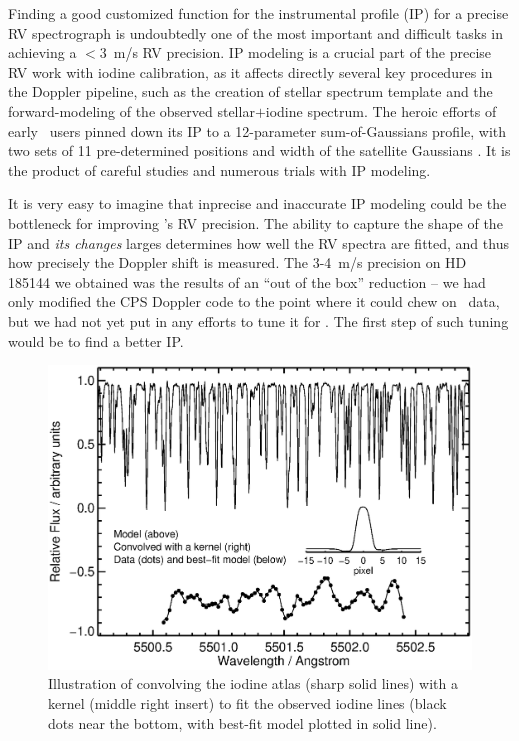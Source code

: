 
Finding a good customized function for the instrumental profile (IP)
for a precise RV spectrograph is undoubtedly one of the most important
and difficult tasks in achieving a $<3$~m/s RV precision. IP modeling
is a crucial part of the precise RV work with iodine calibration, as
it affects directly several key procedures in the Doppler pipeline,
such as the creation of stellar spectrum template and the
forward-modeling of the observed stellar$+$iodine spectrum. The heroic
efforts of early \keck\ users pinned down its IP to a 12-parameter
sum-of-Gaussians profile, with two sets of 11 pre-determined positions
and width of the satellite Gaussians \citep{1995PASP..107..966V}. It
is the product of careful studies and numerous trials with IP
modeling.

It is very easy to imagine that inprecise and inaccurate IP modeling
could be the bottleneck for improving \het's RV precision. The ability
to capture the shape of the IP and {\em its changes} larges determines
how well the RV spectra are fitted, and thus how precisely the Doppler
shift is measured. The 3-4~m/s precision on HD 185144 we obtained was
the results of an ``out of the box'' reduction -- we had only modified
the CPS Doppler code to the point where it could chew on \het\ data,
but we had not yet put in any efforts to tune it for \het. The first
step of such tuning would be to find a better IP.


\begin{figure}
\centering
\includegraphics[scale=0.45]{het/convolution_kernel.eps}
\caption{Illustration of convolving the iodine atlas (sharp solid
  lines) with a kernel (middle right insert) to fit the observed
  iodine lines (black dots near the bottom, with best-fit model
  plotted in solid line).
\label{het:fig:convkernel}}
\end{figure}


